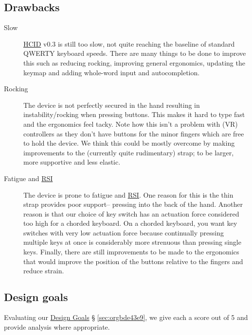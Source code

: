 \documentclass[logo,bsc,singlespacing,parskip]{infthesis}
\begin{document}
\subsection{Drawbacks}
\label{sec:org71f6751}
\begin{description}
\item[{Slow}] \hyperref[orgc00eca5]{HCID} v0.3 is still too slow, not quite reaching the baseline of standard QWERTY keyboard speeds.
There are many things to be done to improve this such as reducing rocking, improving general ergonomics, updating the keymap and adding whole-word input and autocompletion.

\item[{Rocking}] The device is not perfectly secured in the hand resulting in instability/rocking when pressing buttons.
This makes it hard to type fast and the ergonomics feel tacky.
Note how this isn't a problem with (VR) controllers as they don't have buttons for the minor fingers which are free to hold the device.
We think this could be mostly overcome by making improvements to the (currently quite rudimentary) strap; to be larger, more supportive and less elastic.

\item[{Fatigue and \hyperref[orgdb95c62]{RSI}}] The device is prone to fatigue and \hyperref[orgdb95c62]{RSI}.
One reason for this is the thin strap provides poor support-- pressing into the back of the hand.
Another reason is that our choice of key switch has an actuation force considered too high for a chorded keyboard.
On a chorded keyboard, you want key switches with very low actuation force because continually pressing multiple keys at once is considerably more strenuous than pressing single keys.
Finally, there are still improvements to be made to the ergonomics that would improve the position of the buttons relative to the fingers and reduce strain.
\end{description}
\subsection{Design goals}
\label{sec:orgddbb4a3}
Evaluating our \hyperref[sec:orgbde43e9]{Design Goals} § \ref{sec:orgbde43e9}, we give each a score out of 5 and provide analysis where appropriate. \smallskip
\end{document}
